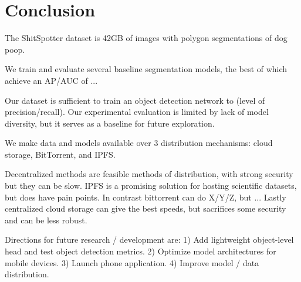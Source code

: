 \documentclass[10pt,twocolumn,letterpaper]{article}
\begin{document}
\section{Conclusion}

The ShitSpotter dataset is 42GB of images with polygon segmentations of dog
poop. 

We train and evaluate several baseline segmentation models, the best of which 
achieve an AP/AUC of ...

Our dataset is sufficient to train an object detection network to (level of
precision/recall).
Our experimental evaluation is limited by lack of model diversity, but it
serves as a baseline for future exploration.

We make data and models available over 3 distribution mechanisms: 
cloud storage, BitTorrent, and IPFS.

Decentralized methods are feasible methods of distribution, with strong
security but they can be slow.
IPFS is a promising solution for hosting scientific datasets, but does have pain points.
In contrast bittorrent can do X/Y/Z, but ...
Lastly centralized cloud storage can give the best speeds, but sacrifices some
security and can be less robust.

Directions for future research / development are:
1) Add lightweight object-level head and test object detection metrics.
2) Optimize model architectures for mobile devices.
3) Launch phone application.
4) Improve model / data distribution.


{\small


}
%
\end{document}
